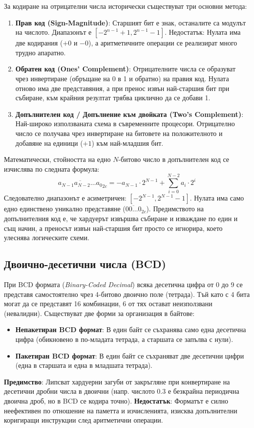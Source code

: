 \documentclass{scrartcl}
\begin{document}
\begin{FlushLeft}
За кодиране на отрицателни числа исторически съществуват три основни метода:
\begin{enumerate}
    \item \textbf{Прав код (Sign-Magnitude)}: Старшият бит е знак, останалите са модулът на числото. Диапазонът е $[-2^{n-1}+1, 2^{n-1}-1]$. Недостатък: Нулата има две кодирания ($+0$ и $-0$), а аритметичните операции се реализират много трудно апаратно.
    \item \textbf{Обратен код (Ones' Complement)}: Отрицателните числа се образуват чрез инвертиране (обръщане на 0 в 1 и обратно) на правия код. Нулата отново има две представяния, а при пренос извън най-старшия бит при събиране, към крайния резултат трябва циклично да се добави 1.
    \item \textbf{Допълнителен код / Допълнение към двойката (Two's Complement)}: Най-широко използваната схема в съвременните процесори. Отрицателно число се получава чрез инвертиране на битовете на положителното и добавяне на единици ($+1$) към най-младшия бит. 
\end{enumerate}

Математически, стойността на едно $N$-битово число в допълнителен код се изчислява по следната формула:
\[ \overline{a_{N-1} a_{N-2} \dots a_0}_{2c} = -a_{N-1} \cdot 2^{N-1} + \sum_{i=0}^{N-2} a_i \cdot 2^i \]
Следователно диапазонът е асиметричен: $[-2^{N-1}, 2^{N-1} - 1]$. Нулата има само едно единствено уникално представяне ($\overline{00\dots0}_{2c}$). Предимството на допълнителния код е, че хардуерът извършва събиране и изваждане по един и същ начин, а преносът извън най-старшия бит просто се игнорира, което улеснява логическите схеми.

\subsection{Двоично-десетични числа (BCD)} 
При BCD формата (\textit{Binary-Coded Decimal}) всяка десетична цифра от 0 до 9 се представя самостоятелно чрез 4-битово двоично поле (тетрада). Тъй като с 4 бита могат да се представят 16 комбинации, 6 от тях остават неизползвани (невалидни). Съществуват две форми за организация в байтове:
\begin{itemize}
    \item \textbf{Непакетиран BCD формат}: В един байт се съхранява само една десетична цифра (обикновено в по-младата тетрада, а старшата се запълва с нули).
    \item \textbf{Пакетиран BCD формат}: В един байт се съхраняват две десетични цифри (една в старшата и една в младшата тетрада).
\end{itemize}
\textbf{Предимство}: Липсват хардуерни загуби от закръгляне при конвертиране на десетични дробни числа в двоични (напр. числото $0.3$ е безкрайна периодична двоична дроб, но в BCD се кодира точно). \textbf{Недостатък}: Форматът е силно неефективен по отношение на паметта и изчисленията, изисква допълнителни коригиращи инструкции след аритметични операции.


\end{FlushLeft}
\end{document}
